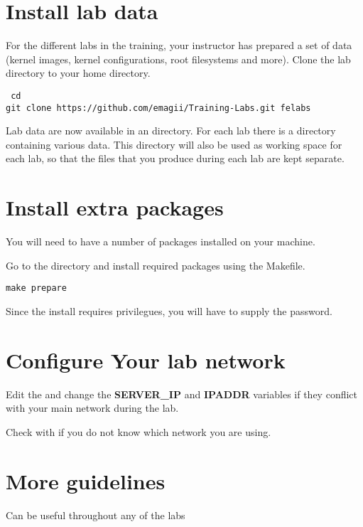 
\section{Install lab data}

For the different labs in the training, your instructor has prepared a
set of data (kernel images, kernel configurations, root filesystems
and more). Clone the lab directory to your home directory.

{\small
{\tt
cd \\
git clone https://github.com/emagii/Training-Labs.git felabs
}
}

Lab data are now available in an \labdir directory. 
For each lab there is a directory containing various
data. This directory will also be used as working space for each lab,
so that the files that you produce during each lab are kept separate.

\section{Install extra packages}

You will need to have a number of packages installed on your machine.

Go to the \labdir directory and install required packages using the Makefile.

\begin{verbatim}
make prepare
\end{verbatim}

Since the install requires  privilegues, you will have to
supply the  password.

\section{Configure Your lab network}

Edit the  and change the {\bf SERVER\_IP} and {\bf IPADDR} variables if
they conflict with your main network during the lab.

Check with  if you do not know which network you are using.

\clearpage
\section{More guidelines}

Can be useful throughout any of the labs

